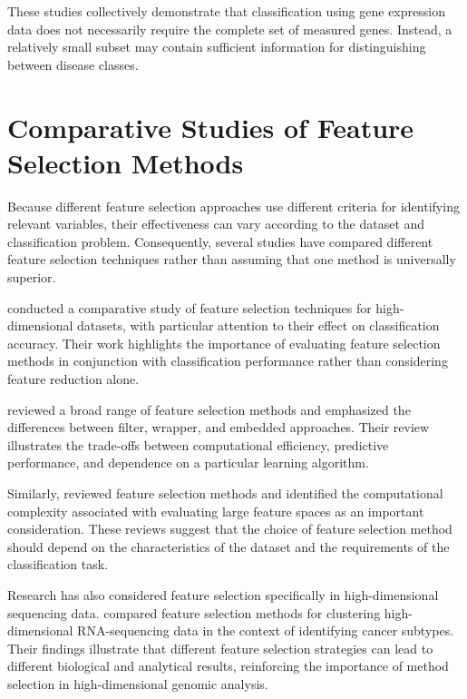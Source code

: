 These studies collectively demonstrate that classification using gene expression data does not necessarily require the complete set of measured genes. Instead, a relatively small subset may contain sufficient information for distinguishing between disease classes.

\section{Comparative Studies of Feature Selection Methods}

Because different feature selection approaches use different criteria for identifying relevant variables, their effectiveness can vary according to the dataset and classification problem. Consequently, several studies have compared different feature selection techniques rather than assuming that one method is universally superior.

\citet{shroff_comparative_2015} conducted a comparative study of feature selection techniques for high-dimensional datasets, with particular attention to their effect on classification accuracy. Their work highlights the importance of evaluating feature selection methods in conjunction with classification performance rather than considering feature reduction alone.

\citet{venkatesh2019review} reviewed a broad range of feature selection methods and emphasized the differences between filter, wrapper, and embedded approaches. Their review illustrates the trade-offs between computational efficiency, predictive performance, and dependence on a particular learning algorithm.

Similarly, \citet{kumar2014feature} reviewed feature selection methods and identified the computational complexity associated with evaluating large feature spaces as an important consideration. These reviews suggest that the choice of feature selection method should depend on the characteristics of the dataset and the requirements of the classification task.

Research has also considered feature selection specifically in high-dimensional sequencing data. \citet{kallberg_comparison_2021} compared feature selection methods for clustering high-dimensional RNA-sequencing data in the context of identifying cancer subtypes. Their findings illustrate that different feature selection strategies can lead to different biological and analytical results, reinforcing the importance of method selection in high-dimensional genomic analysis.

